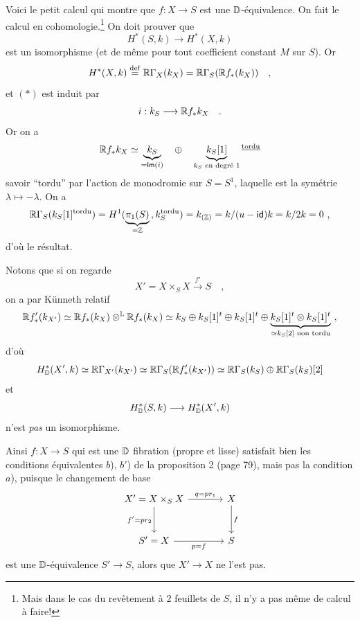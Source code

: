 Voici le petit calcul qui montre que $f : X \to S$ est une $\mathbb{D}$-équivalence. On fait le calcul en cohomologie.\footnote[46]{Mais dans le cas du revêtement à 2 feuillets de $S$, il n'y a pas même de calcul à faire!} On doit prouver que
\[ H^*(S,k) \longrightarrow H^*(X,k) \tag*{$(*)$} \]
est un isomorphisme (et de même pour tout coefficient constant $M$ sur $S$). Or
\[ H^*(X,k) \overset{\mathrm{def}}{=} \mathbb{R}\Gamma_X(k_X) = \mathbb{R}\Gamma_S(\mathbb{R} f_*(k_X)) \quad , \]
et $(*)$ est induit par
\[ i : k_S \longrightarrow \mathbb{R} f_* k_X \quad . \]
Or on a
\[ \mathbb{R} f_* k_X \simeq \underbrace{k_S}_{= \mathsf{Im}(i)} \quad \oplus \quad \underbrace{k_S[1]}_{k_S \text{ en degré } 1}{}^{\underline{\mathrm{tordu}}} \]
savoir ``tordu'' par l'action de monodromie sur $S = S^1$, laquelle est la symétrie $\lambda \mapsto -\lambda$. On a
\[ \mathbb{R}\Gamma_S(k_S[1]^{\mathrm{tordu}}) = H^1(\underbrace{\pi_1(S)}_{= \mathbb{Z}}\, , k_S^{\mathrm{tordu}}) = k_{(\mathbb{Z})} = k/(u - \mathsf{id})k = k/2k = 0 \ , \]
d'où le résultat.

Notons que si on regarde
\[ X' = X \times_S X \xrightarrow{f'} S \quad , \]
on a par Künneth relatif
\[ \mathbb{R} f'_*(k_{X'}) \simeq \mathbb{R} f_*(k_X) \otimes^{\mathbb{L}} \mathbb{R} f_*(k_X) \simeq k_S \oplus k_S[1]^t \oplus k_S[1]^t \oplus \underbrace{k_S[1]^t \otimes k_S[1]^t}_{\simeq k_S[2] \text{ non tordu}} \ , \]
d'où
\[ H^*_{\mathbb{D}}(X',k) \simeq \mathbb{R}\Gamma_{X'}(k_{X'}) \simeq \mathbb{R}\Gamma_S(\mathbb{R} f'_*(k_{X'})) \simeq \mathbb{R}\Gamma_S(k_S) \oplus \mathbb{R}\Gamma_S(k_S)[2] \]
et
\[ H^*_{\mathbb{D}}(S,k) \longrightarrow H^*_{\mathbb{D}}(X',k) \]
n'est \textit{pas} un isomorphisme.

Ainsi $f : X \to S$ qui est une $\mathbb{D}$ fibration (propre et lisse) satisfait bien les conditions équivalentes $b$), $b'$) de la proposition 2 (page 79), mais pas la condition $a$), puisque le changement de base
\[
\begin{tikzcd}[column sep=large, row sep=large]
X' = X \times_S X \arrow[r, "{q = pr_1}"] \arrow[d, "{f' = pr_2}"'] & X \arrow[d, "f"] \\
S' = X \arrow[r, "{p = f}"'] & S
\end{tikzcd}
\]
est une $\mathbb{D}$-équivalence $S' \to S$, alors que $X' \to X$ ne l'est pas.


